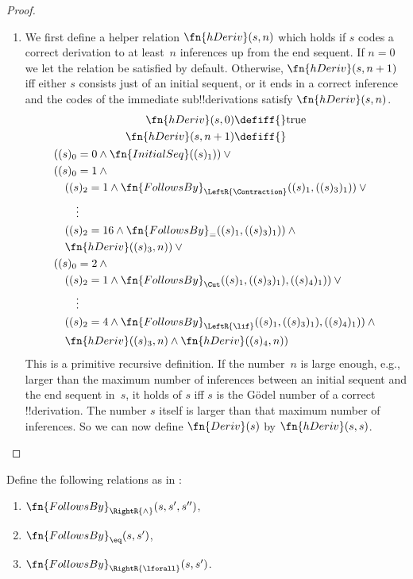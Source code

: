 \documentclass[../../../include/open-logic-section]{subfiles}
\begin{document}
\begin{proof}
\begin{enumerate}
\item We first define a helper relation $\fn{hDeriv}(s,n)$ which holds
  if $s$ codes a correct derivation to at least~$n$ inferences up from
  the end sequent.  If $n=0$ we let the relation be satisfied by
  default.  Otherwise, $\fn{hDeriv}(s, n+1)$ iff either $s$ consists
  just of an initial sequent, or it ends in a correct inference and
  the codes of the immediate sub!!{derivation}s satisfy
  $\fn{hDeriv}(s, n)$.
\begin{multline*}
\begin{aligned}
\fn{hDeriv}(s, 0) \defiff {} & \text{true}\\
\fn{hDeriv}(s, n+1) \defiff {}
\end{aligned}\\
\begin{aligned}
& ((s)_0 = 0 \land \fn{InitialSeq}((s)_1)) \lor{}\\
& ((s)_0 = 1 \land {}\\
& \quad ((s)_2 = 1 \land \fn{FollowsBy}_{\LeftR{\Contraction}}((s)_1, ((s)_3)_1)) \lor{}\\
& \qquad \vdots\\
& \quad ((s)_2 = 16 \land \fn{FollowsBy}_{=}((s)_1, ((s)_3)_1)) \land {}\\
& \quad \fn{hDeriv}((s)_3, n)) \lor {}\\
& ((s)_0 = 2 \land {}\\
& \quad ((s)_2 = 1 \land \fn{FollowsBy}_{\Cut}((s)_1, ((s)_3)_1), ((s)_4)_1)) \lor{}\\
& \qquad \vdots\\
& \quad ((s)_2 = 4 \land \fn{FollowsBy}_{\LeftR{\lif}}((s)_1, ((s)_3)_1), ((s)_4)_1)) \land {}\\
& \quad \fn{hDeriv}((s)_3, n) \land \fn{hDeriv}((s)_4, n))
\end{aligned}
\end{multline*}
This is a primitive recursive definition.  If the number~$n$ is large
enough, e.g., larger than the maximum number of inferences between an
initial sequent and the end sequent in~$s$, it holds of $s$ iff $s$ is
the G\"odel number of a correct !!{derivation}.  The number $s$ itself
is larger than that maximum number of inferences.  So we can now define
$\fn{Deriv}(s)$ by $\fn{hDeriv}(s,s)$.
\end{enumerate}
\end{proof}

\begin{prob}
Define the following relations as in
:
\begin{enumerate}
\item $\fn{FollowsBy}_{\RightR{\land}}(s, s', s'')$,
\item $\fn{FollowsBy}_{\eq}(s, s')$,
\item $\fn{FollowsBy}_{\RightR{\lforall}}(s, s')$.
\end{enumerate}
\end{prob}
\end{document}
